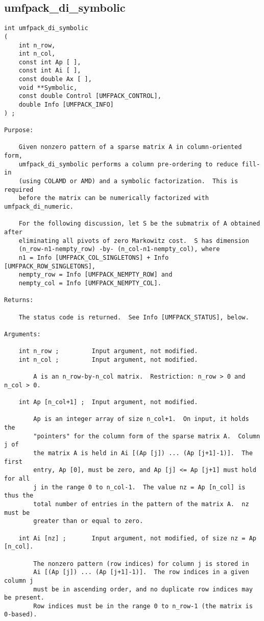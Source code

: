 \documentclass[11pt]{article}
\begin{document}
\subsection{umfpack\_di\_symbolic}

{\footnotesize
\begin{verbatim}
int umfpack_di_symbolic
(
    int n_row,
    int n_col,
    const int Ap [ ],
    const int Ai [ ],
    const double Ax [ ],
    void **Symbolic,
    const double Control [UMFPACK_CONTROL],
    double Info [UMFPACK_INFO]
) ;

Purpose:

    Given nonzero pattern of a sparse matrix A in column-oriented form,
    umfpack_di_symbolic performs a column pre-ordering to reduce fill-in
    (using COLAMD or AMD) and a symbolic factorization.  This is required
    before the matrix can be numerically factorized with umfpack_di_numeric.

    For the following discussion, let S be the submatrix of A obtained after
    eliminating all pivots of zero Markowitz cost.  S has dimension
    (n_row-n1-nempty_row) -by- (n_col-n1-nempty_col), where
    n1 = Info [UMFPACK_COL_SINGLETONS] + Info [UMFPACK_ROW_SINGLETONS],
    nempty_row = Info [UMFPACK_NEMPTY_ROW] and
    nempty_col = Info [UMFPACK_NEMPTY_COL].

Returns:

    The status code is returned.  See Info [UMFPACK_STATUS], below.

Arguments:

    int n_row ;         Input argument, not modified.
    int n_col ;         Input argument, not modified.

        A is an n_row-by-n_col matrix.  Restriction: n_row > 0 and n_col > 0.

    int Ap [n_col+1] ;  Input argument, not modified.

        Ap is an integer array of size n_col+1.  On input, it holds the
        "pointers" for the column form of the sparse matrix A.  Column j of
        the matrix A is held in Ai [(Ap [j]) ... (Ap [j+1]-1)].  The first
        entry, Ap [0], must be zero, and Ap [j] <= Ap [j+1] must hold for all
        j in the range 0 to n_col-1.  The value nz = Ap [n_col] is thus the
        total number of entries in the pattern of the matrix A.  nz must be
        greater than or equal to zero.

    int Ai [nz] ;       Input argument, not modified, of size nz = Ap [n_col].

        The nonzero pattern (row indices) for column j is stored in
        Ai [(Ap [j]) ... (Ap [j+1]-1)].  The row indices in a given column j
        must be in ascending order, and no duplicate row indices may be present.
        Row indices must be in the range 0 to n_row-1 (the matrix is 0-based).


\end{verbatim}}
\end{document}
